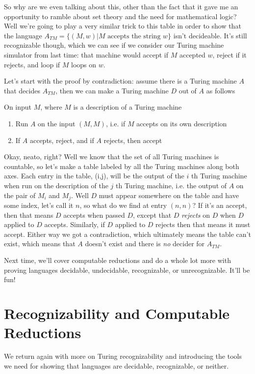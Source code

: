 \documentclass[11pt]{article}
\begin{document}
So why are we even talking about this, other than the fact that it gave me an opportunity to ramble about set theory and the need for mathematical logic? Well we're going to play a very similar trick to this table in order to show that the language $A_{TM} = \{(M,w) | M \text{ accepts the string } w\}$ isn't decideable. It's still recognizable though, which we can see if we consider our Turing machine simulator from last time: that machine would accept if $M$ accepted $w$, reject if it rejects, and loop if $M$ loops on $w$. 

Let's start with the proof by contradiction: assume there is a Turing machine $A$ that decides $A_{TM}$, then we can make a Turing machine $D$ out of $A$ as follows 

On input $M$, where $M$ is a description of a Turing machine

\begin{enumerate}
\item Run $A$ on the input $(M,M)$, i.e. if $M$ accepts on its own description
\item If $A$ accepts, reject, and if $A$ rejects, then accept
\end{enumerate}

Okay, neato, right? Well we know that the set of all Turing machines is countable, so let's make a table labeled by all the Turing machines along both axes. Each entry in the table, (i,j), will be the output of the $i$ th Turing machine when run on the description of the $j$ th Turing machine, i.e. the output of $A$ on the pair of $M_i$ and $M_j$. Well $D$ must appear somewhere on the table and have some index, let's call it $n$, so what do we find at entry $(n,n)$? If it's an accept, then that means $D$ accepts when passed $D$, except that $D$ \emph{rejects} on $D$ when $D$ applied to $D$ accepts. Similarly, if $D$ applied to $D$ rejects then that means it must accept. Either way we got a contradiction, which ultimately means the table can't exist, which means that $A$ doesn't exist and there is \emph{no} decider for $A_{TM}$.

Next time, we'll cover computable reductions and do a whole lot more with proving languages decidable, undecidable, recognizable, or unrecognizable. It'll be fun!
\section{Recognizability and Computable Reductions}
\label{sec-14}
We return again with more on Turing recognizability and introducing the tools we need for showing that languages are decidable, recognizable, or neither.
\end{document}
